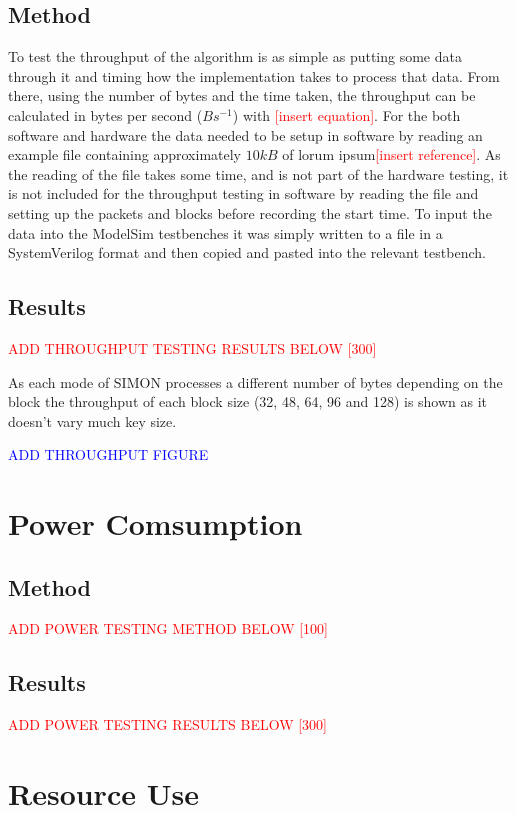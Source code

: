 \documentclass[12pt,twoside,a4paper]{report}
\begin{document}
	\subsection{Method}
	To test the throughput of the algorithm is as simple as putting some data through it and timing how the implementation takes to process that data. From there, using the number of bytes and the time taken, the throughput can be calculated in bytes per second ($Bs^{-1}$) with \textcolor{red}{[insert equation]}. For the both software and hardware the data needed to be setup in software by reading an example file containing approximately $10kB$ of lorum ipsum\textcolor{red}{[insert reference]}. As the reading of the file takes some time, and is not part of the hardware testing, it is not included for the throughput testing in software by reading the file and setting up the packets and blocks before recording the start time. To input the data into the ModelSim testbenches it was simply written to a file in a SystemVerilog format and then copied and pasted into the relevant testbench.
	
	\subsection{Results}
	\textcolor{red}{ADD THROUGHPUT TESTING RESULTS BELOW [300]}
	
	As each mode of SIMON processes a different number of bytes depending on the block the throughput of each block size (32, 48, 64, 96 and 128) is shown as it doesn't vary much key size.  
	
	\textcolor{blue}{ADD THROUGHPUT FIGURE}

	\section{Power Comsumption}
	
	\subsection{Method}
	\textcolor{red}{ADD POWER TESTING METHOD BELOW [100]}
	
	\subsection{Results}
	\textcolor{red}{ADD POWER TESTING RESULTS BELOW [300]}

	\section{Resource Use}
	
\end{document}
